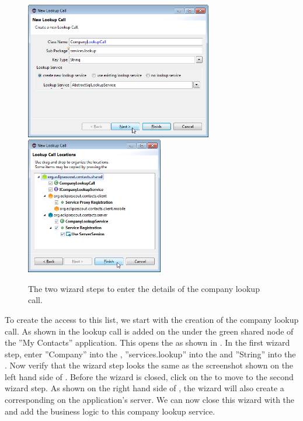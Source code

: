 \documentclass[a4paper,10pt,twoside]{book}
\begin{document}
\begin{figure}
\includegraphics[height=6cm]{new_lookupcall_company_1.png} \hspace{5mm}
\includegraphics[height=6cm]{new_lookupcall_company_2.png}
\caption{The two wizard steps to enter the details of the company lookup call.}
\end{figure}

To create the access to this list, we start with the creation of the company lookup call. 
As shown in  the lookup call is added on the  under the green shared node of the ''My Contacts'' application.
This opens the  as shown in . 
In the first wizard step, enter ''Company'' into the , ''services.lookup'' into the  and ''String'' into the . 
Now verify that the wizard step looks the same as the screenshot shown on the left hand side of .
Before the wizard is closed, click on the  to move to the second wizard step. 
As shown on the right hand side of , the wizard will also create a corresponding  on the application's server. 
We can now close this wizard with the  and add the business logic to this company lookup service. 
\end{document}
